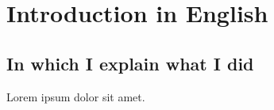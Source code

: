 \setchapterpreamble[u]{\margintoc}
\chapter{Introduction in English}

\section{In which I explain what I did}

Lorem ipsum dolor sit amet.
